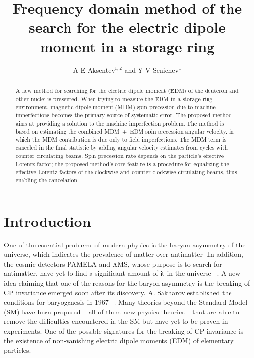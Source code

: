 \documentclass[a4paper]{jpconf}
\begin{document}
	\title{Frequency domain method of the search for the electric dipole moment in a storage ring}
	\author{A E Aksentev$^{1,2}$ and Y V Senichev$^1$}
	\address{$^1$ Institute for Nuclear Research of the Russian Academy of Sciences, Moscow, Russia}
	\address{$^2$ National Research Nuclear University ``MEPhI,'' Moscow, Russia}

	\begin{abstract}
		A new method for searching for the electric dipole moment (EDM) of the deuteron and other nuclei is presented. When trying to measure the EDM in a storage ring environment, magnetic dipole moment (MDM) spin precession due to machine imperfections becomes the primary source of systematic error. The proposed method aims at providing a solution to the machine imperfection problem. The method is based on estimating the combined MDM~+~EDM spin precession angular velocity, in which the MDM contribution is due only to field imperfections. The MDM term is canceled in the final statistic by  adding angular velocity estimates from cycles with counter-circulating beams. Spin precession rate depends on the particle's effective Lorentz factor; the proposed method's core feature is a procedure for equalizing the effective Lorentz factors of the clockwise and counter-clockwise circulating beams, thus enabling the cancelation.
	\end{abstract}

\section{Introduction}
One of the essential problems of modern physics is the baryon asymmetry of the universe, which indicates the prevalence of matter over antimatter~\cite{Canetti}.In addition, the cosmic detectors PAMELA and AMS, whose purpose is to search for antimatter, have yet to find a significant amount of it in the universe ~\cite{Aguilar}. A new idea claiming that one of the reasons for the baryon asymmetry is the breaking of CP invariance emerged soon after its discovery. A. Sakharov established the conditions for baryogenesis in 1967 ~\cite{Sakharov}. Many theories beyond the Standard Model (SM) have been proposed -- all of them new physics theories -- that are able to remove the difficulties encountered in the SM but have yet to be proven in experiments. One of the possible signatures for the breaking of CP invariance is the existence of non-vanishing electric dipole moments (EDM) of elementary particles.
\end{document}
